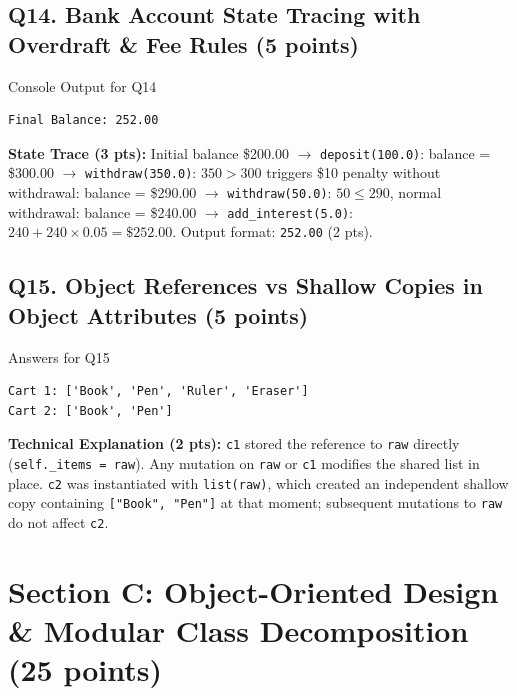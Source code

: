 \documentclass[11pt,a4paper]{article}
\begin{document}
\subsection*{Q14. Bank Account State Tracing with Overdraft \& Fee Rules (5 points)}
\begin{solbox}{Console Output for Q14}
\begin{verbatim}
Final Balance: 252.00
\end{verbatim}
\end{solbox}
\textbf{State Trace (3 pts):} Initial balance \$200.00 $\to$ \texttt{deposit(100.0)}: balance = \$300.00 $\to$ \texttt{withdraw(350.0)}: $350 > 300$ triggers \$10 penalty without withdrawal: balance = \$290.00 $\to$ \texttt{withdraw(50.0)}: $50 \le 290$, normal withdrawal: balance = \$240.00 $\to$ \texttt{add\_interest(5.0)}: $240 + 240 \times 0.05 = \mathbf{\$252.00}$. Output format: \texttt{252.00} (2 pts).

\subsection*{Q15. Object References vs Shallow Copies in Object Attributes (5 points)}
\begin{solbox}{Answers for Q15}
\begin{verbatim}
Cart 1: ['Book', 'Pen', 'Ruler', 'Eraser']
Cart 2: ['Book', 'Pen']
\end{verbatim}
\end{solbox}
\textbf{Technical Explanation (2 pts):} \texttt{c1} stored the reference to \texttt{raw} directly (\texttt{self.\_items = raw}). Any mutation on \texttt{raw} or \texttt{c1} modifies the shared list in place. \texttt{c2} was instantiated with \texttt{list(raw)}, which created an independent shallow copy containing \texttt{["Book", "Pen"]} at that moment; subsequent mutations to \texttt{raw} do not affect \texttt{c2}.

\newpage
\section*{Section C: Object-Oriented Design \& Modular Class Decomposition (25 points)}
\end{document}
